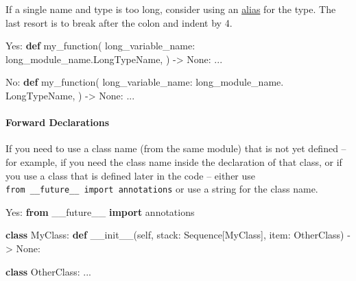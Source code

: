 \documentclass[
]{article}
\newenvironment{Shaded}{}{}
\newcommand{\FunctionTok}[1]{\textcolor[rgb]{0.02,0.16,0.49}{#1}}
\newcommand{\ImportTok}[1]{\textcolor[rgb]{0.00,0.50,0.00}{\textbf{#1}}}
\newcommand{\KeywordTok}[1]{\textcolor[rgb]{0.00,0.44,0.13}{\textbf{#1}}}
\newcommand{\NormalTok}[1]{#1}
\newcommand{\OperatorTok}[1]{\textcolor[rgb]{0.40,0.40,0.40}{#1}}
\newcommand{\VariableTok}[1]{\textcolor[rgb]{0.10,0.09,0.49}{#1}}
\begin{document}
If a single name and type is too long, consider using an
\hyperref[typing-aliases]{alias} for the type. The last resort is to
break after the colon and indent by 4.

\begin{samepage}
\begin{Shaded}
\begin{Highlighting}[]
\NormalTok{Yes:}
\KeywordTok{def}\NormalTok{ my\_function(}
\NormalTok{    long\_variable\_name:}
\NormalTok{        long\_module\_name.LongTypeName,}
\NormalTok{) }\OperatorTok{{-}\textgreater{}} \VariableTok{None}\NormalTok{:}
\NormalTok{  ...}
\end{Highlighting}
\end{Shaded}
\end{samepage}

\begin{samepage}
\begin{Shaded}
\begin{Highlighting}[]
\NormalTok{No:}
\KeywordTok{def}\NormalTok{ my\_function(}
\NormalTok{    long\_variable\_name: long\_module\_name.}
\NormalTok{        LongTypeName,}
\NormalTok{) }\OperatorTok{{-}\textgreater{}} \VariableTok{None}\NormalTok{:}
\NormalTok{  ...}
\end{Highlighting}
\end{Shaded}
\end{samepage}

\paragraph{Forward Declarations}

If you need to use a class name (from the same module) that is not yet
defined -- for example, if you need the class name inside the
declaration of that class, or if you use a class that is defined later
in the code -- either use
\texttt{from\ \_\_future\_\_\ import\ annotations} or use a string for
the class name.

\begin{samepage}
\begin{Shaded}
\begin{Highlighting}[]
\NormalTok{Yes:}
\ImportTok{from}\NormalTok{ \_\_future\_\_ }\ImportTok{import}\NormalTok{ annotations}

\KeywordTok{class}\NormalTok{ MyClass:}
  \KeywordTok{def} \FunctionTok{\_\_init\_\_}\NormalTok{(}\VariableTok{self}\NormalTok{, stack: Sequence[MyClass], item: OtherClass) }\OperatorTok{{-}\textgreater{}} \VariableTok{None}\NormalTok{:}

\KeywordTok{class}\NormalTok{ OtherClass:}
\NormalTok{  ...}
\end{Highlighting}
\end{Shaded}
\end{samepage}
\end{document}
